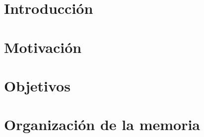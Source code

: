 
\section{Introducción}


\section{Motivación}


\section{Objetivos}


\section{Organización de la memoria}
